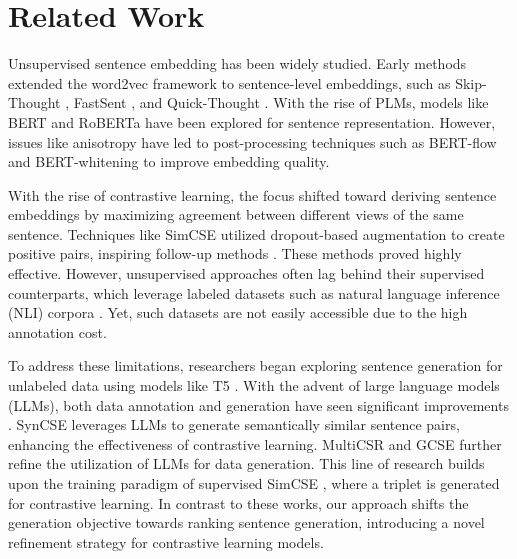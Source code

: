 \section{Related Work}
Unsupervised sentence embedding has been widely studied. Early methods extended the word2vec framework \cite{mikolov2013distributed} to sentence-level embeddings, such as Skip-Thought \cite{kiros2015skip}, FastSent \cite{hill2016learning}, and Quick-Thought \cite{logeswaran2018efficient}. With the rise of PLMs, models like BERT \cite{kenton2019bert} and RoBERTa \cite{liu2019roberta} have been explored for sentence representation. However, issues like anisotropy \cite{ethayarajh2019contextual} have led to post-processing techniques such as BERT-flow \cite{li2020sentence} and BERT-whitening \cite{su2021whitening} to improve embedding quality.

With the rise of contrastive learning, the focus shifted toward deriving sentence embeddings by maximizing agreement between different views of the same sentence. Techniques like SimCSE \cite{gao2021simcse} utilized dropout-based augmentation to create positive pairs, inspiring follow-up methods \cite{wang2022improving,chuang2022diffcse,liu2023rankcse,jiang2022promptbert,wu2022pcl,miao2023debcse}. These methods proved highly effective. However, unsupervised approaches often lag behind their supervised counterparts, which leverage labeled datasets such as natural language inference (NLI) corpora \cite{bowman2015large,williams2018broad}. Yet, such datasets are not easily accessible due to the high annotation cost.

To address these limitations, researchers began exploring sentence generation for unlabeled data \cite{chen2022generate,ye2022progen} using models like T5 \cite{chung2024scaling}. With the advent of large language models (LLMs), both data annotation and generation have seen significant improvements \cite{gilardi2023chatgpt,alizadeh2023open,alizadeh2025open}. SynCSE \cite{zhang2023contrastive} leverages LLMs to generate semantically similar sentence pairs, enhancing the effectiveness of contrastive learning. MultiCSR \cite{wang2024large} and GCSE \cite{lai2024enhancing} further refine the utilization of LLMs for data generation. This line of research builds upon the training paradigm of supervised SimCSE \cite{gao2021simcse}, where a triplet is generated for contrastive learning. In contrast to these works, our approach shifts the generation objective towards ranking sentence generation, introducing a novel refinement strategy for contrastive learning models.